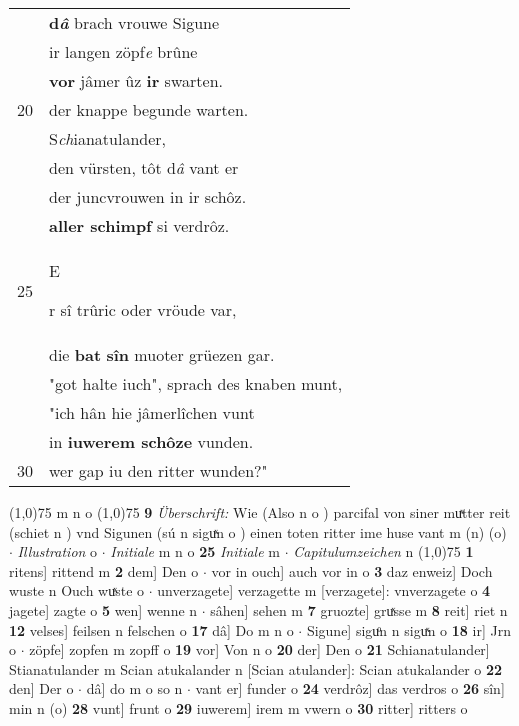 \documentclass[8pt,a4paper,notitlepage]{article}
\begin{document}
\begin{table}[ht]
\begin{minipage}[t]{0.5\linewidth}
\begin{tabular}{rl}
 & \textbf{d\textit{â}} brach vrouwe Sigune\\ 
 & ir langen zöpf\textit{e} brûne\\ 
 & \textbf{vor} jâmer ûz \textbf{ir} swarten.\\ 
20 & der knappe begunde warten.\\ 
 & S\textit{ch}ianatulander,\\ 
 & den vürsten, tôt d\textit{â} vant er\\ 
 & der juncvrouwen in ir schôz.\\ 
 & \textbf{aller schimpf} si verdrôz.\\ 
25 & \begin{large}E\end{large}r sî trûric oder vröude var,\\ 
 & die \textbf{bat} \textbf{sîn} muoter grüezen gar.\\ 
 & "got halte iuch", sprach des knaben munt,\\ 
 & "ich hân hie jâmerlîchen vunt\\ 
 & in \textbf{iuwerem schôze} vunden.\\ 
30 & wer gap iu den ritter wunden?"\\ 
\end{tabular}
\scriptsize
\line(1,0){75} \newline
m n o \newline
\line(1,0){75} \newline
\textbf{9} \textit{Überschrift:} Wie (Also n o  ) parcifal von siner muͯtter reit (schiet n  ) vnd Sigunen (sú n  siguͯn o  ) einen toten ritter ime huse vant m (n) (o)   $\cdot$ \textit{Illustration} o   $\cdot$ \textit{Initiale} m n o  \textbf{25} \textit{Initiale} m   $\cdot$ \textit{Capitulumzeichen} n  \newline
\line(1,0){75} \newline
\textbf{1} ritens] rittend m \textbf{2} dem] Den o  $\cdot$ vor in ouch] auch vor in o \textbf{3} daz enweiz] Doch wuste n Ouch wuͯste o  $\cdot$ unverzagete] verzagette m [verzagete]: vnverzagete o \textbf{4} jagete] zagte o \textbf{5} wen] wenne n  $\cdot$ sâhen] sehen m \textbf{7} gruozte] gruͯsse m \textbf{8} reit] riet n \textbf{12} velses] feilsen n felschen o \textbf{17} dâ] Do m n o  $\cdot$ Sigune] siguͦn n siguͯn o \textbf{18} ir] Jrn o  $\cdot$ zöpfe] zopfen m zopff o \textbf{19} vor] Von n o \textbf{20} der] Den o \textbf{21} Schianatulander] Stianatulander m Scian atukalander n [Scian atulander]: Scian atukalander o \textbf{22} den] Der o  $\cdot$ dâ] do m o so n  $\cdot$ vant er] funder o \textbf{24} verdrôz] das verdros o \textbf{26} sîn] min n (o) \textbf{28} vunt] frunt o \textbf{29} iuwerem] irem m vwern o \textbf{30} ritter] ritters o \newline
\end{minipage}
\end{table}
\end{document}
